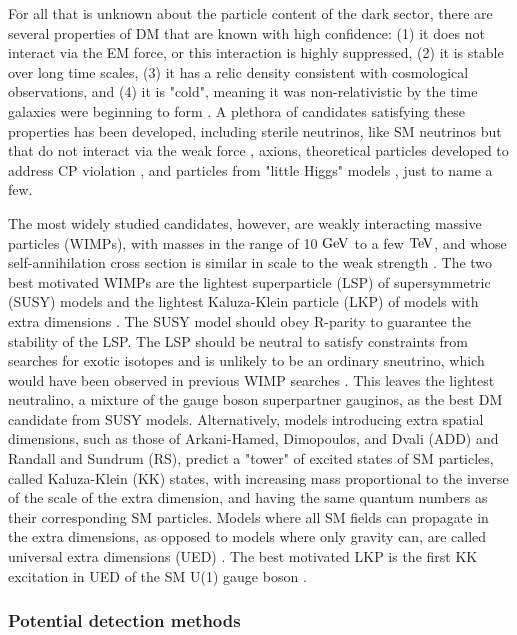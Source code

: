\indent For all that is unknown about the particle content of the dark sector, there are several properties of DM that are known with high confidence: (1) it does not interact via the EM force, or this interaction is highly suppressed, (2) it is stable over long time scales, (3) it has a relic density consistent with cosmological observations, and (4) it is "cold", meaning it was non-relativistic by the time galaxies were beginning to form \cite{Bertone:2004pz}. A plethora of candidates satisfying these properties has been developed, including sterile neutrinos, like SM neutrinos but that do not interact via the weak force \cite{Dodelson:1993je}, axions, theoretical particles developed to address CP violation \cite{Rosenberg:2000wb}, and particles from "little Higgs" models \cite{BirkedalHansen:2003mpa, Cheng:2003ju}, just to name a few. 

\indent The most widely studied candidates, however, are weakly interacting massive particles (WIMPs), with masses in the range of 10 $\mathrm{Ge\kern -0.1em V}$ to a few $\mathrm{Te\kern -0.1em V}$, and whose self-annihilation cross section is similar in scale to the weak strength \cite{Bertone:2004pz}. The two best motivated WIMPs are the lightest superparticle (LSP) of supersymmetric (SUSY) models \cite{Jungman:1995df} and the lightest Kaluza-Klein particle (LKP) of models with extra dimensions \cite{Kolb:1983fm}. The SUSY model should obey R-parity to guarantee the stability of the LSP. The LSP should be neutral to satisfy constraints from searches for exotic isotopes and is unlikely to be an ordinary sneutrino, which would have been observed in previous WIMP searches \cite{Agashe:2014kda}. This leaves the lightest neutralino, a mixture of the gauge boson superpartner gauginos, as the best DM candidate from SUSY models. Alternatively, models introducing extra spatial dimensions, such as those of Arkani-Hamed, Dimopoulos, and Dvali (ADD) \cite{ArkaniHamed:1998rs} and Randall and Sundrum (RS)\cite{Randall:1999ee}, predict a "tower" of excited states of SM particles, called Kaluza-Klein (KK) states, with increasing mass proportional to the inverse of the scale of the extra dimension, and having the same quantum numbers as their corresponding SM particles. Models where all SM fields can propagate in the extra dimensions, as opposed to models where only gravity can, are called universal extra dimensions (UED) \cite{Appelquist:2000nn}. The best motivated LKP is the first KK excitation in UED of the SM U(1) gauge boson \cite{Cheng:2002iz}. 

\subsubsection{Potential detection methods}

